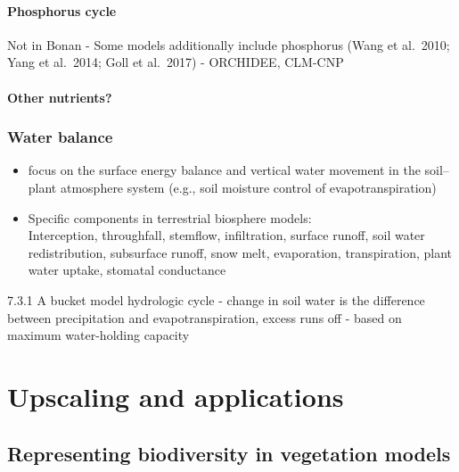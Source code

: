 \documentclass[
  oneside]{book}
\begin{document}
\hypertarget{phosphorus-cycle}{%
\subsection{Phosphorus cycle}\label{phosphorus-cycle}}

Not in Bonan
- Some models additionally include phosphorus (Wang et al.~2010; Yang et al.~2014; Goll et al.~2017)
- ORCHIDEE, CLM-CNP

\hypertarget{other-nutrients}{%
\subsection{Other nutrients?}\label{other-nutrients}}

\hypertarget{water-balance}{%
\section{Water balance}\label{water-balance}}

\begin{itemize}
\item
  focus on the surface energy balance and vertical water movement in the soil--plant atmosphere system (e.g., soil moisture control of evapotranspiration)
\item
  Specific components in terrestrial biosphere models:\\
  Interception, throughfall, stemflow, infiltration, surface runoff, soil water redistribution, subsurface runoff, snow melt, evaporation, transpiration, plant water uptake, stomatal conductance
\end{itemize}

7.3.1 A bucket model hydrologic cycle
- change in soil water is the difference between precipitation and evapotranspiration, excess runs off
- based on maximum water-holding capacity

\hypertarget{part-upscaling-and-applications}{%
\part{Upscaling and applications}\label{part-upscaling-and-applications}}

\hypertarget{representing-biodiversity-in-vegetation-models}{%
\chapter{Representing biodiversity in vegetation models}\label{representing-biodiversity-in-vegetation-models}}
\end{document}
